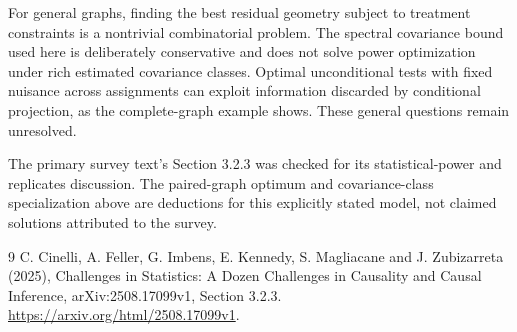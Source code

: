 \documentclass[11pt]{article}
\theoremstyle{remark}\newtheorem{remark}[theorem]{Remark}
\begin{document}
For general graphs, finding the best residual geometry subject to treatment constraints is a nontrivial combinatorial problem. The spectral covariance bound used here is deliberately conservative and does not solve power optimization under rich estimated covariance classes. Optimal unconditional tests with fixed nuisance across assignments can exploit information discarded by conditional projection, as the complete-graph example shows. These general questions remain unresolved.

The primary survey text's Section 3.2.3 was checked for its statistical-power and replicates discussion. The paired-graph optimum and covariance-class specialization above are deductions for this explicitly stated model, not claimed solutions attributed to the survey.
\begin{thebibliography}{9}
 C. Cinelli, A. Feller, G. Imbens, E. Kennedy, S. Magliacane and J. Zubizarreta (2025), Challenges in Statistics: A Dozen Challenges in Causality and Causal Inference, arXiv:2508.17099v1, Section 3.2.3. \url{https://arxiv.org/html/2508.17099v1}.
\end{thebibliography}
\end{document}
